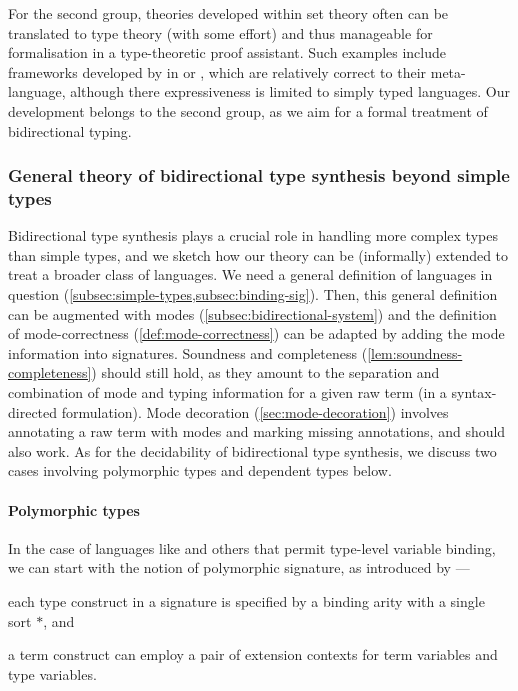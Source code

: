 For the second group, theories developed within set theory often can be translated to type theory (with some effort) and thus manageable for formalisation in a type-theoretic proof assistant. 
Such examples include frameworks developed by \citet{Ahrens2022,Allais2021,Fiore2022} in \Coq or \Agda, which are relatively correct to their meta-language, although there expressiveness is limited to simply typed languages.
Our development belongs to the second group, as we aim for a formal treatment of bidirectional typing.

\subsubsection{General theory of bidirectional type synthesis beyond simple types}

Bidirectional type synthesis plays a crucial role in handling more complex types than simple types, and we sketch how our theory can be (informally) extended to treat a broader class of languages.
We need a general definition of languages in question (\cref{subsec:simple-types,subsec:binding-sig}).
Then, this general definition can be augmented with modes (\cref{subsec:bidirectional-system}) and the definition of mode-correctness (\cref{def:mode-correctness}) can be adapted by adding the mode information into signatures.
Soundness and completeness (\cref{lem:soundness-completeness}) should still hold, as they amount to the separation and combination of mode and typing information for a given raw term (in a syntax-directed formulation).
Mode decoration (\cref{sec:mode-decoration}) involves annotating a raw term with modes and marking missing annotations, and should also work.
As for the decidability of bidirectional type synthesis, we discuss two cases involving polymorphic types and dependent types below.

\paragraph{Polymorphic types}
In the case of languages like \SystemF and others that permit type-level variable binding, we can start with the notion of polymorphic signature, as introduced by \citet{Hamana2011}---\begin{inlineenum}
  \item each type construct in a signature is specified by a binding arity with a single sort $*$, and
  \item a term construct can employ a pair of extension contexts for term variables and type variables.
\end{inlineenum}

